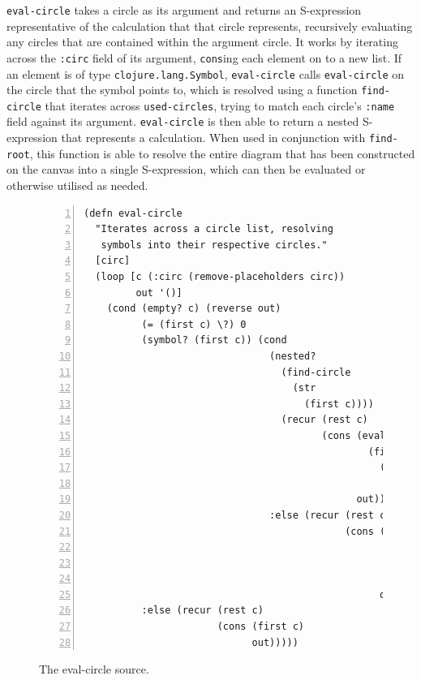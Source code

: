 \documentclass[12pt,twoside,notitlepage,xetex]{report}
\begin{document}
\verb¬eval-circle¬ takes a circle as its argument and returns an S-expression
representative of the calculation that that circle represents, recursively
evaluating any circles that are contained within the argument circle.  It works
by iterating across the \verb¬:circ¬ field of its argument, \verb¬cons¬ing each
element on to a new list.  If an element is of type \verb¬clojure.lang.Symbol¬,
\verb¬eval-circle¬ calls \verb¬eval-circle¬ on the circle that the symbol
points to, which is resolved using a function \verb¬find-circle¬ that iterates
across \verb¬used-circles¬, trying to match each circle's \verb¬:name¬ field
against its argument.  \verb¬eval-circle¬ is then able to return a nested
S-expression that represents a calculation.  When used in conjunction with
\verb¬find-root¬, this function is able to resolve the entire diagram that has
been constructed on the canvas into a single S-expression, which can then be
evaluated or otherwise utilised as needed.

\begin{center}
\begin{figure}[H]
\begin{center}
\begin{minipage}{8.2cm}%
\begin{Verbatim}[fontsize=\tiny,numbers=left]
(defn eval-circle
  "Iterates across a circle list, resolving
   symbols into their respective circles."
  [circ]
  (loop [c (:circ (remove-placeholders circ))
         out '()]
    (cond (empty? c) (reverse out)
          (= (first c) \?) 0
          (symbol? (first c)) (cond
                                (nested?
                                  (find-circle
                                    (str
                                      (first c))))
                                  (recur (rest c)
                                         (cons (eval-circle
                                                 (find-circle
                                                   (str
                                                     (first c))))
                                               out))
                                :else (recur (rest c)
                                             (cons (:circ
                                                     (find-circle
                                                       (str
                                                         (first c))))
                                                   out)))
          :else (recur (rest c)
                       (cons (first c)
                             out)))))
\end{Verbatim}
\end{minipage}
\end{center}
\caption{The {\ttfamily eval-circle} source.}
\end{figure}
\end{center}
\end{document}
